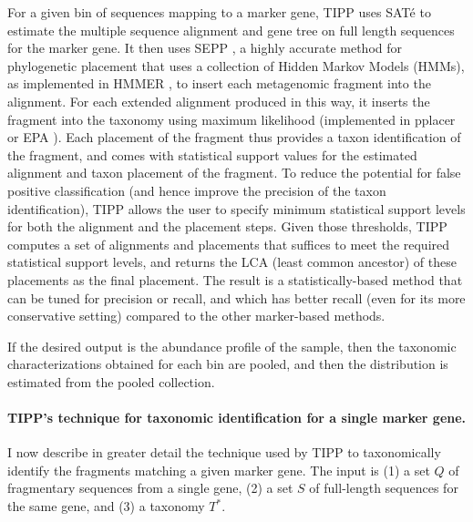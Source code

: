 For a given bin of sequences mapping to a marker
gene, TIPP uses 
SAT\'{e} \cite{Liu2009,Liu2012} to estimate
the multiple sequence alignment and gene tree
on full length sequences for the marker gene.
It then 
uses SEPP \cite{Mirarab2012}, a highly accurate method for phylogenetic placement
that uses a collection of
Hidden Markov Models (HMMs), 
as implemented in HMMER \cite{Eddy1998},
to insert each metagenomic fragment into the alignment.
For each extended alignment produced in this way,
it inserts the fragment into the taxonomy using maximum likelihood
(implemented in pplacer \cite{Matsen2010} or EPA \cite{Berger2011}).
Each placement of the fragment thus provides a taxon identification of
the fragment, and comes with statistical support values for the
estimated
alignment and taxon placement of
the fragment.  To reduce the potential for
false positive classification (and hence improve the
precision of the taxon identification), TIPP allows the user to
specify minimum statistical support levels for both the alignment and
the placement steps.  Given those thresholds, TIPP computes a
set of alignments and placements that suffices to meet the required
statistical support levels, and returns the LCA (least common ancestor) of these
placements as the final placement. The result is a
statistically-based method that can be tuned for precision or recall,
and which has better recall (even for its more
conservative setting) compared to the other marker-based methods.  

If the desired output is the abundance profile of the
sample, then the taxonomic characterizations obtained
for each bin are pooled, and then the distribution is
estimated from the pooled collection.

\paragraph{\bf TIPP's technique for taxonomic identification for
a single marker gene. }
I now describe in greater detail the 
technique used by TIPP to taxonomically identify the
fragments matching a given marker gene.
The input 
is (1) a set $Q$ of fragmentary
sequences from a single gene,
(2) a set $S$ of
full-length sequences for the same gene, and (3)
a taxonomy $T^*$.

